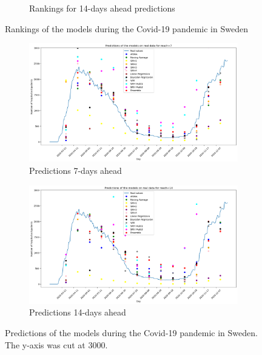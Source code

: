 \begin{figure}[h!]
\begin{subfigure}[b]{0.45\textwidth}
      \caption{Rankings for 14-days ahead predictions}
      \label{fig:sousfig2}
    \end{subfigure}
    \caption{Rankings of the models during the Covid-19 pandemic in Sweden}
    \label{fig:rankings_real_data}
\end{figure}


\begin{figure}[h!]
    \centering
    \begin{subfigure}[b]{0.5\textwidth}
      \centering
      \includegraphics[width=\textwidth]{figures/real_data_7.png}  %
      \caption{Predictions 7-days ahead}
      \label{fig:sousfig1g}
    \end{subfigure}
    \hfill
    \begin{subfigure}[b]{0.5\textwidth}
      \centering
      \includegraphics[width=\textwidth]{figures/real_data_14.png}  %
      \caption{Predictions 14-days ahead}
      \label{fig:sousfig2g}
    \end{subfigure}
    \caption{Predictions of the models during the Covid-19 pandemic in Sweden. The y-axis was cut at 3000.}
    \label{fig:real_data}
\end{figure}